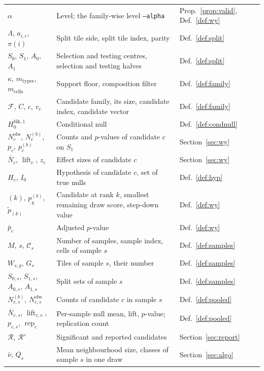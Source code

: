 \documentclass[11pt,a4paper]{article}
\theoremstyle{remark}
\newcommand{\cells}{\mathcal{C}}
\newcommand{\obs}{\mathrm{obs}}
\newcommand{\lift}{\operatorname{lift}}
\newcommand{\rep}{\operatorname{rep}}
\newcommand{\minp}{\underline{p}}
\newcommand{\mtypes}{m_{\mathrm{types}}}
\newcommand{\mcells}{m_{\mathrm{cells}}}
\begin{document}
\begin{small}
\begin{longtable}{lp{8.2cm}l}
$\alpha$ & Level; the family-wise level \texttt{--alpha} & Prop.~\ref{prop:valid}, Def.~\ref{def:wy} \\
$\Lambda$, $a_{i,e}$, $\pi(i)$ & Split tile side, split tile index, parity & Def.~\ref{def:split} \\
$S_0$, $S_1$, $A_0$, $A_1$ & Selection and testing centres, selection and testing halves & Def.~\ref{def:split} \\
$\kappa$, $\mtypes$, $\mcells$ & Support floor, composition filter & Def.~\ref{def:family} \\
$\mathcal F$, $C$, $c$, $v_c$ & Candidate family, its size, candidate index, candidate vector & Def.~\ref{def:family} \\
$H_0^{\mathrm{blk},1}$ & Conditional null & Def.~\ref{def:condnull} \\
$N^{\obs}_c$, $N^{(b)}_c$, $p_c$, $p^{(b)}_c$ & Counts and $p$-values of candidate $c$ on $S_1$ & Section~\ref{sec:wy} \\
$\bar N_c$, $\lift_c$, $z_c$ & Effect sizes of candidate $c$ & Section~\ref{sec:wy} \\
$H_c$, $I_0$ & Hypothesis of candidate $c$, set of true nulls & Def.~\ref{def:hyp} \\
$(k)$, $\minp^{(b)}_k$, $\tilde p_{(k)}$ & Candidate at rank $k$, smallest remaining draw score, step-down value & Def.~\ref{def:wy} \\
$\bar p_c$ & Adjusted $p$-value & Def.~\ref{def:wy} \\
$M$, $s$, $\cells_s$ & Number of samples, sample index, cells of sample $s$ & Def.~\ref{def:samples} \\
$W_{s,g}$, $G_s$ & Tiles of sample $s$, their number & Def.~\ref{def:samples} \\
$S_{0,s}$, $S_{1,s}$, $A_{0,s}$, $A_{1,s}$ & Split sets of sample $s$ & Def.~\ref{def:samples} \\
$N^{(b)}_{c,s}$, $N^{\obs}_{c,s}$ & Counts of candidate $c$ in sample $s$ & Def.~\ref{def:pooled} \\
$\bar N_{c,s}$, $\lift_{c,s}$, $p_{c,s}$, $\rep_c$ & Per-sample null mean, lift, $p$-value; replication count & Def.~\ref{def:pooled} \\
$\mathcal R$, $\mathcal R'$ & Significant and reported candidates & Section~\ref{sec:report} \\
$\bar\nu$, $Q_s$ & Mean neighbourhood size, classes of sample $s$ in one draw & Section~\ref{sec:algo} \\
\end{longtable}
\end{small}
\end{document}
